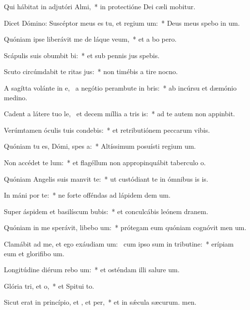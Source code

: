 \item Qui hábitat in adjutóri Almi,~* in protectióne Dei cæli mobitur.
\item Dicet Dómino: Suscéptor meus es tu, et regium um:~* Deus meus spebo in um.
\item Quóniam ipse liberávit me de láque veum,~* et a bo pero.
\item Scápulis suis obumbit bi:~* et sub pennis jus spebis.
\item Scuto circúmdabit te ritas jus:~* non timébis a tire nocno.
\item A sagítta volánte in e,~\pscross{} a negótio perambute in bris:~* ab incúrsu et dæmónio medino.
\item Cadent a látere tuo le,~\pscross{} et decem míllia a tris is:~* ad te autem non appinbit.
\item Verúmtamen óculis tuis condebis:~* et retributiónem peccarum vibis.
\item Quóniam tu es, Dómi, spes a:~* Altíssimum posuísti regium um.
\item Non accédet  te lum:~* et flagéllum non appropinquábit taberculo o.
\item Quóniam Angelis suis manvit  te:~* ut custódiant te in ómnibus is is.
\item In máni por te:~* ne forte offéndas ad lápidem dem um.
\item Super áspidem et basilíscum bubis:~* et conculcábis leónem  dranem.
\item Quóniam in me sperávit, libebo um:~* prótegam eum quóniam cognóvit men um.
\item Clamábit ad me, et ego exáudiam um:~\pscross{} cum ipso sum in tributine:~* erípiam eum et glorifibo um.
\item Longitúdine diérum rebo um:~* et osténdam illi salure um.
\item Glória tri, et o,~* et Spitui to.
\item Sicut erat in princípio, et , et per,~* et in sǽcula sæcurum. men.

